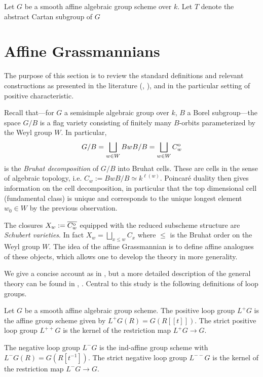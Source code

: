 \documentclass[12pt]{article}
\begin{document}
Let $G$ be a smooth affine algebraic group scheme over $k$. Let $T$ denote the abstract Cartan subgroup of $G$

\section{Affine Grassmannians}

The purpose of this section is to review the standard definitions and relevant constructions as presented in the literature (\cite{Zhu2016}, \cite{Faltings2003}), and in the particular setting of positive characteristic. 

Recall that---for $G$ a semisimple algebraic group over $k$, $B$ a Borel subgroup---the space $G/B$ is a flag variety consisting of finitely many $B$-orbits parameterized by the Weyl group $W$. In particular,
\begin{equation}\label{bruhat}
    G/B = \bigsqcup_{w \in W} BwB/B = \bigsqcup_{w \in W} C^{\mathrm{o}}_w
\end{equation}
is the \textit{Bruhat decomposition} of $G/B$ into Bruhat cells. These are cells in the sense of algebraic topology, i.e. $C_w := BwB/B \simeq k^{\ell(w)}$. Poincar\'e duality then gives information on the cell decomposition, in particular that the top dimensional cell (fundamental class) is unique and corresponds to the unique longest element $w_0 \in W$ by the previous observation. 

The closures $X_w := \overline{C^{\mathrm{o}}_w}$ equipped with the reduced subscheme structure are \textit{Schubert varieties}. In fact $X_w = \bigsqcup_{x \leq w} C_x$ where $\leq$ is the Bruhat order on the Weyl group $W$. The idea of the affine Grassmannian is to define affine analogues of these objects, which allows one to develop the theory in more generality.

We give a concise account as in \cite{Faltings2003}, but a more detailed description of the general theory can be found in \cite{Zhu2016}, \cite{Sorger2000}. Central to this study is the following definitions of loop groups.

\begin{defn}
    Let $G$ be a smooth affine algebraic group scheme. The positive loop group $L^+G$ is the affine group scheme given by $L^+G(R) = G(R[[t]])$. The strict positive loop group $L^{++}G$ is the kernel of the restriction map $L^+G \to G$. 
\end{defn}
    

\begin{defn}
    The negative loop group $L^-G$ is the ind-affine group scheme with $L^-G(R) = G(R[t^{-1}])$. The strict negative loop group $L^{--}G$ is the kernel of the restriction map $L^-G \to G$.
\end{defn}
\end{document}
